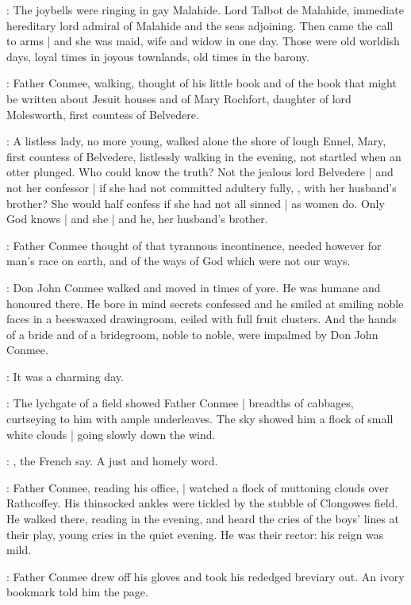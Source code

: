 \conmeeint:
The joybells were ringing in gay Malahide.
Lord Talbot de Malahide,
immediate hereditary lord admiral of Malahide and the seas adjoining.
Then came the call to arms |
and she was maid, wife and widow in one day.
Those were old worldish days,
loyal times in joyous townlands,
old times in the barony.%

:
Father Conmee, walking, thought of his little book
and of the book that might be written about Jesuit houses
and of Mary Rochfort,
daughter of lord Molesworth,
first countess of Belvedere.

\conmeeint:
A listless lady, no more young,
walked alone the shore of lough Ennel,
Mary, first countess of Belvedere,
listlessly walking in the evening,
not startled when an otter plunged.
Who could know the truth?
Not the jealous lord Belvedere |
and not her confessor |
if she had not committed adultery fully,
,
with her husband's brother?
She would half confess if she had not all sinned |
as women do.
Only God knows |
and she |
and he, her husband's brother.

:
Father Conmee thought of that tyrannous incontinence,
needed however for man's race on earth,
and of the ways of God which were not our ways.

:
Don John Conmee walked and moved in times of yore.
He was humane and honoured there.
He bore in mind secrets confessed
and he smiled at smiling noble faces in a beeswaxed drawingroom,
ceiled with full fruit clusters.
And the hands of a bride and of a bridegroom,
noble to noble,
were impalmed by Don John Conmee.

:
It was a charming day.

:
The lychgate of a field showed Father Conmee |
breadths of cabbages,
curtseying to him with ample underleaves.
The sky showed him a flock of small white clouds |
going slowly down the wind.

\conmeeint:
, the French say.
A just and homely word.

:
Father Conmee, reading his office, |
watched a flock of muttoning clouds over Rathcoffey.
His thinsocked ankles were tickled by the stubble of Clongowes field.
He walked there, reading in the evening,
and heard the cries of the boys' lines at their play,
young cries in the quiet evening.
He was their rector: his reign was mild.

:
Father Conmee drew off his gloves
and took his rededged breviary out.
An ivory bookmark told him the page.

